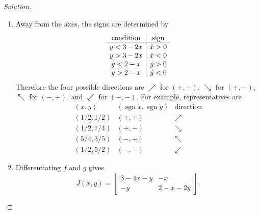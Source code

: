 \documentclass[12pt]{amsart}
\theoremstyle{conjecture}
\theoremstyle{definition}
\theoremstyle{question}
\theoremstyle{theorem}
\newenvironment{solution}
{\begin{proof}[Solution]}
{\end{proof}}
\begin{document}
\begin{enumerate}[leftmargin=2em]
\begin{solution}
\begin{enumerate}[label=(\alph*),leftmargin=2.2em]
        \item Away from the axes, the signs are determined by
        \[
            \begin{array}{c|c}
                \text{condition}&\text{sign}\rule{0pt}{2.4ex}\\ \hline
                y<3-2x&\dot x>0\\
                y>3-2x&\dot x<0\\
                y<2-x&\dot y>0\\
                y>2-x&\dot y<0
            \end{array}
        \]
        Therefore the four possible directions are
        $\nearrow$ for $(+,+)$, $\searrow$ for $(+,-)$,
        $\nwarrow$ for $(-,+)$, and $\swarrow$ for $(-,-)$.
        For example, representatives are
        \[
            \begin{array}{c|c|c}
                (x,y)&(\operatorname{sgn}\dot x,\operatorname{sgn}\dot y)&
                \text{direction}\\ \hline
                (1/2,1/2)&(+,+)&\nearrow\\
                (1/2,7/4)&(+,-)&\searrow\\
                (5/4,3/5)&(-,+)&\nwarrow\\
                (1/2,5/2)&(-,-)&\swarrow
            \end{array}
        \]

        \item Differentiating $f$ and $g$ gives
        \[
            \boxed{J(x,y)=
                \begin{bmatrix}
                    3-4x-y&-x\\
                    -y&2-x-2y
                \end{bmatrix}}.
        \]


\end{enumerate}
\end{solution}
\end{enumerate}
\end{document}
